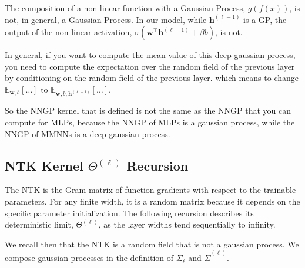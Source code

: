 \documentclass[12pt]{article}
\begin{document}
\begin{itemize}
    The composition of a non-linear function with a Gaussian Process, $g(f(x))$, is not, in general, a Gaussian Process. In our model, while $\bm{h}^{(\ell-1)}$ is a GP, the output of the non-linear activation, $\sigma(\bm{w}^\top \bm{h}^{(\ell-1)} + \beta b)$, is not.
   
    In general, if you want to compute the mean value of this deep gaussian process, you need to compute the expectation over the random field of the previous layer by conditioning on the random field of the previous layer.
    which means to change $\mathbb{E}_{\bm{w}, b} \left[ \dots \right]$ to $\mathbb{E}_{\bm{w}, b, \bm{h}^{(\ell-1)}} \left[ \dots \right]$.

    So the NNGP kernel that is defined is not the same as the NNGP that you can compute for MLPs, because the NNGP of MLPs is a gaussian process, while the NNGP of MMNNs is a deep gaussian process.
\end{itemize}

\subsection{NTK Kernel \(\Theta^{(\ell)}\) Recursion}
The NTK is the Gram matrix of function gradients with respect to the trainable parameters. For any finite width, it is a random matrix because it depends on the specific parameter initialization. The following recursion describes its deterministic limit, $\Theta^{(\ell)}$, as the layer widths tend sequentially to infinity.

We recall then that the NTK is a random field that is not a gaussian process. 
We compose gaussian processes in the definition of $\Sigma_{\ell}$ and  $\dot{\Sigma}^{(\ell)}$.
\end{document}
